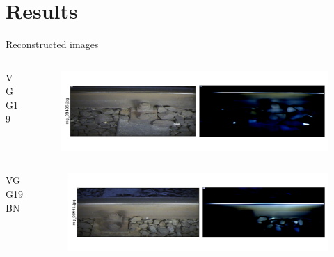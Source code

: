 \documentclass[aspectratio=169]{beamer}
\begin{document}
\section{Results}
\begin{frame}[t]{Reconstructed images}
    \begin{columns}
        \begin{column}{0.2\textwidth}
            \centering
            VGG19
        \end{column}
        \begin{column}{0.75\textwidth}
            \begin{figure}
                \centering
                \includegraphics[width=\columnwidth,trim={0 1cm 0 1cm},clip]{./results/vgg19_vgg19/20230510_172958_predict_0.png}
            \end{figure}
        \end{column}
    \end{columns}
    \begin{columns}
        \begin{column}{0.2\textwidth}
            \centering
            VGG19 BN
        \end{column}
        \begin{column}{0.75\textwidth}
            \begin{figure}
                \centering
                \includegraphics[width=\columnwidth,trim={0 1cm 0 1cm},clip]{./results/vgg19_bn_vgg19/20230525_045131_predict_0.png}
            \end{figure}
        \end{column}
    \end{columns}
\end{frame}
\end{document}
